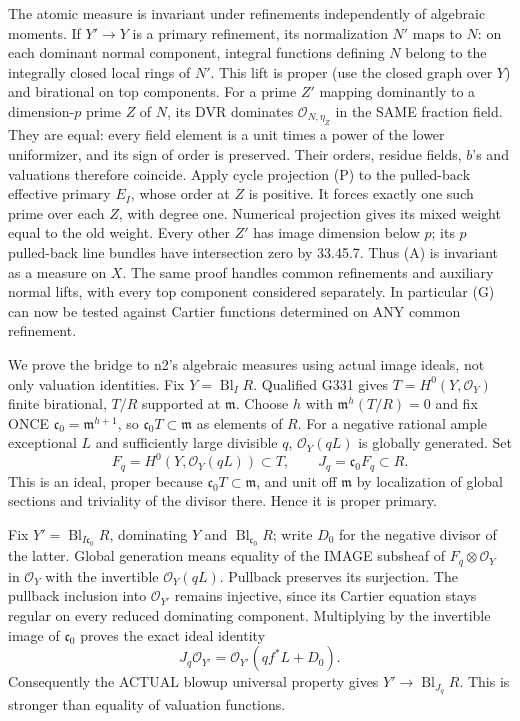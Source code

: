 The atomic measure is invariant under refinements independently of algebraic moments. If \(Y'\to Y\) is a primary refinement, its normalization \(N'\) maps to \(N\): on each dominant normal component, integral functions defining \(N\) belong to the integrally closed local rings of \(N'\). This lift is proper (use the closed graph over \(Y\)) and birational on top components. For a prime \(Z'\) mapping dominantly to a dimension-\(p\) prime \(Z\) of \(N\), its DVR dominates \(\mathcal O_{N,\eta_Z}\) in the SAME fraction field. They are equal: every field element is a unit times a power of the lower uniformizer, and its sign of order is preserved. Their orders, residue fields, \(b\)'s and valuations therefore coincide. Apply cycle projection (P) to the pulled-back effective primary \(E_I\), whose order at \(Z\) is positive. It forces exactly one such prime over each \(Z\), with degree one. Numerical projection gives its mixed weight equal to the old weight. Every other \(Z'\) has image dimension below \(p\); its \(p\) pulled-back line bundles have intersection zero by 33.45.7. Thus (A) is invariant as a measure on \(X\). The same proof handles common refinements and auxiliary normal lifts, with every top component considered separately. In particular (G) can now be tested against Cartier functions determined on ANY common refinement.

We prove the bridge to n2's algebraic measures using actual image ideals, not only valuation identities. Fix \(Y=\operatorname{Bl}_I R\). Qualified G331 gives \(T=H^0(Y,\mathcal O_Y)\) finite birational, \(T/R\) supported at \(\mathfrak m\). Choose \(h\) with \(\mathfrak m^h(T/R)=0\) and fix ONCE
\(\mathfrak c_0=\mathfrak m^{h+1}\), so \(\mathfrak c_0T\subset\mathfrak m\) as elements of \(R\). For a negative rational ample exceptional \(L\) and sufficiently large divisible \(q\), \(\mathcal O_Y(qL)\) is globally generated. Set
\[
F_q=H^0(Y,\mathcal O_Y(qL))\subset T,\qquad J_q=\mathfrak c_0F_q\subset R.
\]
This is an ideal, proper because \(\mathfrak c_0T\subset\mathfrak m\), and unit off \(\mathfrak m\) by localization of global sections and triviality of the divisor there. Hence it is proper primary.

Fix \(Y'=\operatorname{Bl}_{I\mathfrak c_0}R\), dominating \(Y\) and \(\operatorname{Bl}_{\mathfrak c_0}R\); write \(D_0\) for the negative divisor of the latter. Global generation means equality of the IMAGE subsheaf of \(F_q\otimes\mathcal O_Y\) in \(\mathcal O_Y\) with the invertible \(\mathcal O_Y(qL)\). Pullback preserves its surjection. The pullback inclusion into \(\mathcal O_{Y'}\) remains injective, since its Cartier equation stays regular on every reduced dominating component. Multiplying by the invertible image of \(\mathfrak c_0\) proves the exact ideal identity
\[
J_q\mathcal O_{Y'}=\mathcal O_{Y'}(qf^*L+D_0). \tag{S}
\]
Consequently the ACTUAL blowup universal property gives \(Y'\to\operatorname{Bl}_{J_q}R\). This is stronger than equality of valuation functions.

